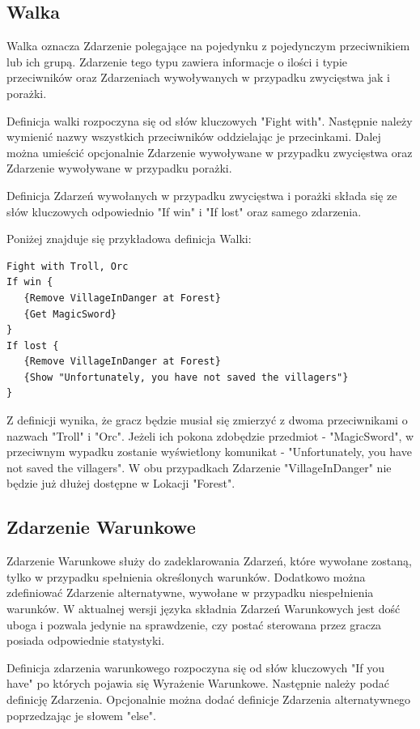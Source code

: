 \documentclass	{xmgr}
\begin{document}
\subsection{Walka}
Walka oznacza Zdarzenie polegające na pojedynku z pojedynczym przeciwnikiem lub ich grupą. Zdarzenie tego typu zawiera informacje o ilości i typie przeciwników oraz Zdarzeniach wywoływanych w przypadku zwycięstwa jak i porażki.

Definicja walki rozpoczyna się od słów kluczowych "Fight with". Następnie należy wymienić nazwy wszystkich przeciwników oddzielając je przecinkami. Dalej można umieścić opcjonalnie Zdarzenie wywoływane w przypadku zwycięstwa oraz Zdarzenie wywoływane w przypadku porażki.

Definicja Zdarzeń wywołanych w przypadku zwycięstwa i porażki składa się ze słów kluczowych odpowiednio "If win" i "If lost" oraz samego zdarzenia.

Poniżej znajduje się przykładowa definicja Walki:
\begin{lstlisting}
Fight with Troll, Orc
If win {
   {Remove VillageInDanger at Forest}
   {Get MagicSword}
}
If lost {
   {Remove VillageInDanger at Forest}
   {Show "Unfortunately, you have not saved the villagers"}
}
\end{lstlisting}

Z definicji wynika, że gracz będzie musiał się zmierzyć z dwoma przeciwnikami o nazwach "Troll" i "Orc". Jeżeli ich pokona zdobędzie przedmiot - "MagicSword", w przeciwnym wypadku zostanie wyświetlony komunikat - "Unfortunately, you have not saved the villagers". W obu przypadkach Zdarzenie "VillageInDanger" nie będzie już dłużej dostępne w Lokacji "Forest".

\subsection{Zdarzenie Warunkowe}
Zdarzenie Warunkowe służy do zadeklarowania Zdarzeń, które wywołane zostaną, tylko w przypadku spełnienia określonych warunków. Dodatkowo można zdefiniować Zdarzenie alternatywne, wywołane w przypadku niespełnienia warunków. W aktualnej wersji języka składnia Zdarzeń Warunkowych jest dość uboga i pozwala jedynie na sprawdzenie, czy postać sterowana przez gracza posiada odpowiednie statystyki.

Definicja zdarzenia warunkowego rozpoczyna się od słów kluczowych "If you have" po których pojawia się Wyrażenie Warunkowe. Następnie należy podać definicję Zdarzenia. Opcjonalnie można dodać definicje Zdarzenia alternatywnego poprzedzając je słowem "else".
\end{document}
